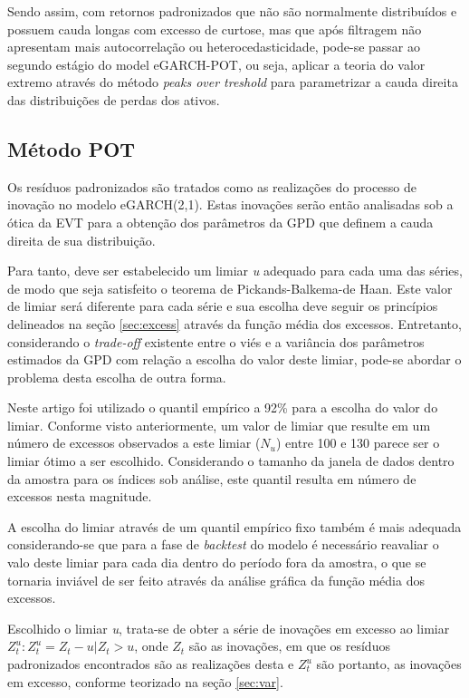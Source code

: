 \documentclass[1p]{elsarticle}
\theoremstyle{definition}
\begin{document}
Sendo assim, com retornos padronizados que não são normalmente distribuídos e possuem cauda longas com excesso de curtose, mas que após filtragem não apresentam mais autocorrelação ou heterocedasticidade, pode-se passar ao segundo estágio do model eGARCH-POT, ou seja, aplicar a teoria do valor extremo através do método \emph{peaks over treshold} para parametrizar a cauda direita das distribuições de perdas dos ativos.

\subsection{Método POT}
\label{sec:metpot}

Os resíduos padronizados são tratados como as realizações do processo de inovação no modelo eGARCH(2,1). Estas inovações serão então analisadas sob a ótica da EVT para a obtenção dos parâmetros da GPD que definem a cauda direita de sua distribuição.

Para tanto, deve ser estabelecido um limiar \emph{u} adequado para cada uma das séries, de modo que seja satisfeito o teorema de Pickands-Balkema-de Haan. Este valor de limiar será diferente para cada série e sua escolha deve seguir os princípios delineados na seção \ref{sec:excess} através da função média dos excessos. Entretanto, considerando o \emph{trade-off} existente entre o viés e a variância dos parâmetros estimados da GPD com relação a escolha do valor deste limiar, pode-se abordar o problema desta escolha de outra forma.

Neste artigo foi utilizado o quantil empírico a 92\% para a escolha do valor do limiar. Conforme visto anteriormente, um valor de limiar que resulte em um número de excessos observados a este limiar ($N_u$) entre 100 e 130 parece ser o limiar ótimo a ser escolhido. Considerando o tamanho da janela de dados dentro da amostra para os índices sob análise, este quantil resulta em número de excessos nesta magnitude.

A escolha do limiar através de um quantil empírico fixo também é mais adequada considerando-se que para a fase de \emph{backtest} do modelo é necessário reavaliar o valo deste limiar para cada dia dentro do período fora da amostra, o que se tornaria inviável de ser feito através da análise gráfica da função média dos excessos.

Escolhido o limiar \emph{u}, trata-se de obter a série de inovações em excesso ao limiar $Z^u_t:{Z^u_t = Z_t-u |Z_t > u}$, onde $Z_t$ são as inovações, em que os resíduos padronizados encontrados são as realizações desta e $Z^u_t$ são portanto, as inovações em excesso, conforme teorizado na seção \ref{sec:var}.
\end{document}
